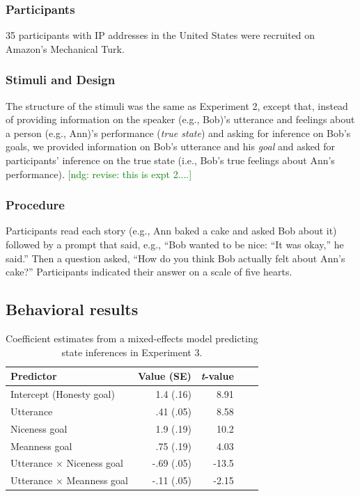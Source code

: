 \documentclass[10pt,letterpaper]{article}
\newcommand{\ndg}[1]{\textcolor{Green}{[ndg: #1]}}
\begin{document}
\subsubsection{Participants}

35 participants with IP addresses in the United States were recruited on Amazon's Mechanical Turk. 

\subsubsection{Stimuli and Design}

The structure of the stimuli was the same as Experiment 2, except that, instead of providing information on the speaker (e.g., Bob)'s utterance and feelings about a person (e.g., Ann)'s performance (\emph{true state}) and asking for inference on Bob's goals, we provided information on Bob's utterance and his \emph{goal} and asked for participants' inference on the true state (i.e., Bob's true feelings about Ann's performance). 
\ndg{revise: this is expt 2....}

\subsubsection{Procedure}
Participants read each story (e.g., Ann baked a cake and asked Bob about it) followed by a prompt that said, 
e.g., ``Bob wanted to be nice: ``It was okay,'' he said.''
Then a question asked, ``How do you think Bob actually felt about Ann's cake?''
Participants indicated their answer on a scale of five hearts.

\subsection{Behavioral results}


\begin{table}[tb]
\caption{\label{tab:lmer2}  Coefficient estimates from a mixed-effects model predicting state inferences in Experiment 3.} 
\begin{center} 
\begin{tabular}{l r r r l} 
\hline
Predictor  &  Value (SE) & \emph{t}-value\\
\hline
Intercept (Honesty goal)  & 1.4 (.16) & 8.91 \\
Utterance & .41 (.05) &  8.58 \\
Niceness goal  & 1.9 (.19) & 10.2 \\
Meanness goal & .75 (.19) & 4.03 \\
Utterance $\times$ Niceness goal & -.69 (.05) & -13.5 \\
Utterance $\times$ Meanness goal & -.11 (.05) & -2.15 \\
\hline
\end{tabular} 
\end{center} 
\end{table}
\end{document}
